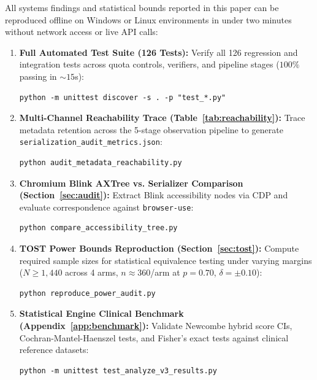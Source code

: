 \documentclass[11pt,a4paper]{article}
\begin{document}
All systems findings and statistical bounds reported in this paper can be reproduced offline on Windows or Linux environments in under two minutes without network access or live API calls:
\begin{enumerate}
    \item \textbf{Full Automated Test Suite (126 Tests):}
    Verify all 126 regression and integration tests across quota controls, verifiers, and pipeline stages ($100\%$ passing in $\sim 15$s):
\begin{lstlisting}
python -m unittest discover -s . -p "test_*.py"
\end{lstlisting}

    \item \textbf{Multi-Channel Reachability Trace (Table~\ref{tab:reachability}):}
    Trace metadata retention across the 5-stage observation pipeline to generate \texttt{serialization\_audit\_metrics.json}:
\begin{lstlisting}
python audit_metadata_reachability.py
\end{lstlisting}

    \item \textbf{Chromium Blink AXTree vs. Serializer Comparison (Section~\ref{sec:audit}):}
    Extract Blink accessibility nodes via CDP and evaluate correspondence against \texttt{browser-use}:
\begin{lstlisting}
python compare_accessibility_tree.py
\end{lstlisting}

    \item \textbf{TOST Power Bounds Reproduction (Section~\ref{sec:tost}):}
    Compute required sample sizes for statistical equivalence testing under varying margins ($N \ge 1,440$ across 4 arms, $n \approx 360$/arm at $p=0.70$, $\delta = \pm 0.10$):
\begin{lstlisting}
python reproduce_power_audit.py
\end{lstlisting}

    \item \textbf{Statistical Engine Clinical Benchmark (Appendix~\ref{app:benchmark}):}
    Validate Newcombe hybrid score CIs, Cochran-Mantel-Haenszel tests, and Fisher's exact tests against clinical reference datasets:
\begin{lstlisting}
python -m unittest test_analyze_v3_results.py
\end{lstlisting}
\end{enumerate}
\end{document}
